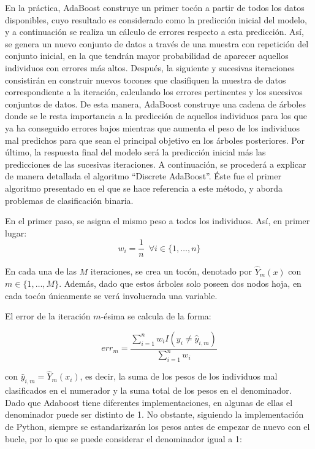 \documentclass[12pt,twoside]{article}
\begin{document}
En la práctica, AdaBoost construye un primer tocón a partir de todos los datos disponibles, cuyo resultado es considerado como la predicción inicial del modelo, y a continuación se realiza un cálculo de errores respecto a esta predicción. Así, se genera un nuevo conjunto de datos a través de una muestra con repetición del conjunto inicial, en la que tendrán mayor probabilidad de aparecer aquellos individuos con errores más altos. Después, la siguiente y sucesivas iteraciones consistirán en construir nuevos tocones que clasifiquen la muestra de datos correspondiente a la iteración, calculando los errores pertinentes y los sucesivos conjuntos de datos. De esta manera, AdaBoost construye una cadena de árboles donde se le resta importancia a la predicción de aquellos individuos para los que ya ha conseguido errores bajos mientras que aumenta el peso de los individuos mal predichos para que sean el principal objetivo en los árboles posteriores. Por último, la respuesta final del modelo será la predicción inicial más las predicciones de las sucesivas iteraciones. A continuación, se procederá a explicar de manera detallada el algoritmo ``Discrete AdaBoost''. Éste fue el primer algoritmo presentado en el que se hace referencia a este método, y aborda problemas de clasificación binaria. 

En el primer paso, se asigna el mismo peso a todos los individuos. Así, en primer lugar:
\begin{equation*}
w_i = \frac{1}{n} \, \, \, \forall i \in \{1, \dots, n \}
\end{equation*}

En cada una de las $M$ iteraciones, se crea un tocón, denotado por $\hat{Y}_m(x)$ con $m \in \{1, \dots, M \}$. Además, dado que estos árboles solo poseen dos nodos hoja, en cada tocón únicamente se verá involucrada una variable.

El error de la iteración $m$-ésima se calcula de la forma:

\begin{equation*}
err_m = \frac{\sum_{i=1}^{n} w_i I(y_i \neq \hat{y}_{i, m})}{\sum_{i=1}^{n} w_i} 
\end{equation*}

\noindent
con $\hat{y}_{i, m} = \hat{Y}_m(x_i)$, es decir, la suma de los pesos de los individuos mal clasificados en el numerador y la suma total de los pesos en el denominador. Dado que Adaboost tiene diferentes implementaciones, en algunas de ellas el denominador puede ser distinto de 1. No obstante, siguiendo la implementación de Python, siempre se estandarizarán los pesos antes de empezar de nuevo con el bucle, por lo que se puede considerar el denominador igual a 1:
\end{document}
